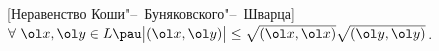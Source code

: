 [Неравенство Коши"--~Буняковского"--~Шварца]\label{K-B-SH}
	 $\forall\ \ol x,\ol y\in L\pau \big|(\ol x,\ol y)\big|\leq\sqrt{(\ol x,\ol x)}\sqrt{(\ol y,\ol y)}$.
	 